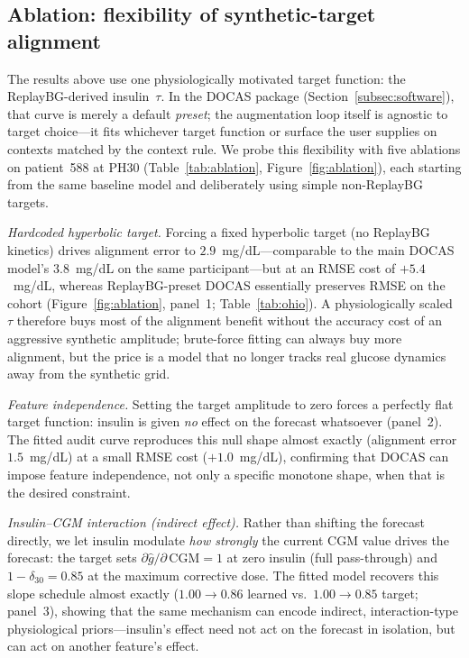 \documentclass[a4paper,fleqn]{cas-sc}
\begin{document}
\subsection{Ablation: flexibility of synthetic-target alignment}\label{subsec:ablation}

The results above use one physiologically motivated target function: the
ReplayBG-derived insulin~$\tau$. In the DOCAS package
(Section~\ref{subsec:software}), that curve is merely a default \emph{preset}; the augmentation loop itself is agnostic to target
choice---it fits whichever target function or surface the user supplies on
contexts matched by the context rule. We probe this flexibility with five ablations on
patient~588 at PH30 (Table~\ref{tab:ablation}, Figure~\ref{fig:ablation}), each
starting from the same baseline model and deliberately using simple
non-ReplayBG targets.

\emph{Hardcoded hyperbolic target.} Forcing a fixed hyperbolic target (no
ReplayBG kinetics) drives alignment error to $2.9$~mg/dL---comparable to the
main DOCAS model's $3.8$~mg/dL on the same participant---but at an RMSE cost of
$+5.4$~mg/dL, whereas ReplayBG-preset DOCAS essentially preserves RMSE on the
cohort (Figure~\ref{fig:ablation}, panel~1; Table~\ref{tab:ohio}).
A physiologically scaled $\tau$ therefore buys most of the alignment benefit
without the accuracy cost of an aggressive synthetic amplitude; brute-force
fitting can always buy more alignment, but the price is a model that no longer
tracks real glucose dynamics away from the synthetic grid.

\emph{Feature independence.} Setting the target amplitude to zero forces a
perfectly flat target function: insulin is given \emph{no} effect on the forecast
whatsoever (panel~2). The fitted audit curve reproduces this null shape almost
exactly (alignment error $1.5$~mg/dL) at a small RMSE cost ($+1.0$~mg/dL),
confirming that DOCAS can impose feature independence, not only a specific
monotone shape, when that is the desired constraint.

\emph{Insulin--CGM interaction (indirect effect).} Rather than shifting the
forecast directly, we let insulin modulate \emph{how strongly} the current
CGM value drives the forecast: the target sets
$\partial\hat g/\partial\,\mathrm{CGM}=1$ at zero insulin (full pass-through)
and $1-\delta_{30}=0.85$ at the maximum corrective dose. The fitted model
recovers this slope schedule almost exactly ($1.00\!\to\!0.86$ learned vs.\
$1.00\!\to\!0.85$ target; panel~3), showing that the same mechanism can encode
indirect, interaction-type physiological priors---insulin's effect need not
act on the forecast in isolation, but can act on another feature's effect.
\end{document}
